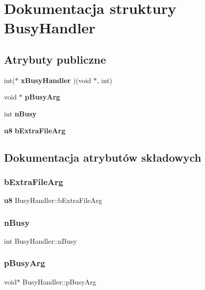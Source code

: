 \section{Dokumentacja struktury Busy\+Handler}
\label{struct_busy_handler}
\subsection*{Atrybuty publiczne}
\begin{DoxyCompactItemize}
\item 
int($\ast$ \textbf{ x\+Busy\+Handler} )(void $\ast$, int)
\item 
void $\ast$ \textbf{ p\+Busy\+Arg}
\item 
int \textbf{ n\+Busy}
\item 
\textbf{ u8} \textbf{ b\+Extra\+File\+Arg}
\end{DoxyCompactItemize}


\subsection{Dokumentacja atrybutów składowych}
\mbox{\label{struct_busy_handler_a51ada0569a07057c498ce8fd378cb04b}} 
\subsubsection{bExtraFileArg}
{\footnotesize\ttfamily \textbf{ u8} Busy\+Handler\+::b\+Extra\+File\+Arg}

\mbox{\label{struct_busy_handler_aac4531c677ed5ae9e4757ca1b02c568b}} 
\subsubsection{nBusy}
{\footnotesize\ttfamily int Busy\+Handler\+::n\+Busy}

\mbox{\label{struct_busy_handler_ad66e9e9ec748a413a7122c298b285783}} 
\subsubsection{pBusyArg}
{\footnotesize\ttfamily void$\ast$ Busy\+Handler\+::p\+Busy\+Arg}

